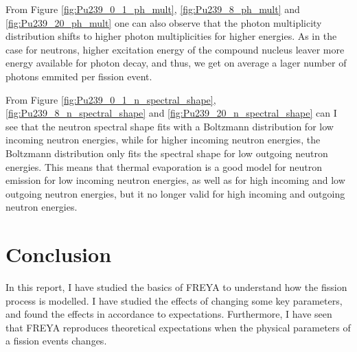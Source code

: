 \documentclass[]{article}
\begin{document}
From Figure \ref{fig:Pu239_0_1_ph_mult}, \ref{fig:Pu239_8_ph_mult} and \ref{fig:Pu239_20_ph_mult} one can also observe that the photon multiplicity distribution shifts to higher photon multiplicities for higher energies. As in the case for neutrons, higher excitation energy of the compound nucleus leaver more energy available for photon decay, and thus, we get on average a lager number of photons emmited per fission event.

From Figure \ref{fig:Pu239_0_1_n_spectral_shape}, \ref{fig:Pu239_8_n_spectral_shape} and \ref{fig:Pu239_20_n_spectral_shape} can I see that the neutron spectral shape fits with a Boltzmann distribution for low incoming neutron energies, while for higher incoming neutron energies, the Boltzmann distribution only fits the spectral shape for low outgoing neutron energies. This means that thermal evaporation is a good model for neutron emission for low incoming neutron energies, as well as for high incoming and low outgoing neutron energies, but it no longer valid for high incoming and outgoing neutron energies. 

\section{Conclusion}
In this report, I have studied the basics of FREYA to understand how the fission process is modelled. I have studied the effects of changing some key parameters, and found the effects in accordance to expectations. Furthermore, I have seen that FREYA reproduces theoretical expectations when the physical parameters of a fission events changes.



\vspace{3mm}

\newpage



\end{document}
